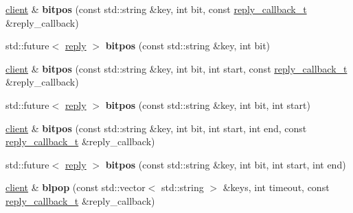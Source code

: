 \begin{DoxyCompactItemize}
\item 
\mbox{\label{classcpp__redis_1_1client_adf2ef5d020a8efbf6f6eb91cde63f262}} 
\hyperlink{classcpp__redis_1_1client}{client} \& {\bfseries bitpos} (const std\+::string \&key, int bit, const \hyperlink{classcpp__redis_1_1client_a061a1140d36d2eaeda82b09a0bb3f9f2}{reply\+\_\+callback\+\_\+t} \&reply\+\_\+callback)
\item 
\mbox{\label{classcpp__redis_1_1client_a5be47a4b3f9a36c4fab420468d50256a}} 
std\+::future$<$ \hyperlink{classcpp__redis_1_1reply}{reply} $>$ {\bfseries bitpos} (const std\+::string \&key, int bit)
\item 
\mbox{\label{classcpp__redis_1_1client_a8f6b7958a3094c975c3ca053b263c523}} 
\hyperlink{classcpp__redis_1_1client}{client} \& {\bfseries bitpos} (const std\+::string \&key, int bit, int start, const \hyperlink{classcpp__redis_1_1client_a061a1140d36d2eaeda82b09a0bb3f9f2}{reply\+\_\+callback\+\_\+t} \&reply\+\_\+callback)
\item 
\mbox{\label{classcpp__redis_1_1client_aa0ae004e45eb37ffed4d8c9f5ea35b4c}} 
std\+::future$<$ \hyperlink{classcpp__redis_1_1reply}{reply} $>$ {\bfseries bitpos} (const std\+::string \&key, int bit, int start)
\item 
\mbox{\label{classcpp__redis_1_1client_a3655449a666a9111d3dce7e61932ab1b}} 
\hyperlink{classcpp__redis_1_1client}{client} \& {\bfseries bitpos} (const std\+::string \&key, int bit, int start, int end, const \hyperlink{classcpp__redis_1_1client_a061a1140d36d2eaeda82b09a0bb3f9f2}{reply\+\_\+callback\+\_\+t} \&reply\+\_\+callback)
\item 
\mbox{\label{classcpp__redis_1_1client_a43b5121105276ccae731bb6093c80e02}} 
std\+::future$<$ \hyperlink{classcpp__redis_1_1reply}{reply} $>$ {\bfseries bitpos} (const std\+::string \&key, int bit, int start, int end)
\item 
\mbox{\label{classcpp__redis_1_1client_a432c2677b13dc8e2a9d7afe7eade39e3}} 
\hyperlink{classcpp__redis_1_1client}{client} \& {\bfseries blpop} (const std\+::vector$<$ std\+::string $>$ \&keys, int timeout, const \hyperlink{classcpp__redis_1_1client_a061a1140d36d2eaeda82b09a0bb3f9f2}{reply\+\_\+callback\+\_\+t} \&reply\+\_\+callback)

\end{DoxyCompactItemize}
